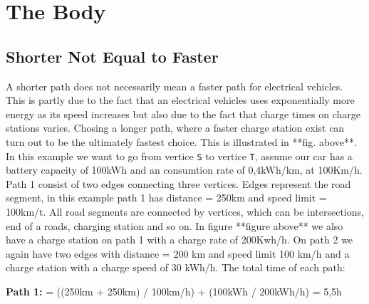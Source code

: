 \section{The Body}

\subsection{Shorter Not Equal to Faster}


A shorter path does not necessarily mean a faster path for electrical vehicles. 
This is partly due to the fact that an electrical vehicles uses exponentially more energy 
as its speed increases but also due to the fact that charge times on charge stations
varies. Chosing a longer path, where a faster charge station exist can turn out to
be the ultimately fastest choice. This is illustrated in **fig. above**. In this example we want to go from vertice \texttt{S} to vertice \texttt{T}, assume our car has a battery capacity of 100kWh and an consumtion rate of 0,4kWh/km, at 100Km/h. Path 1 consist of two edges connecting three vertices. Edges represent the road segment, in this example path 1 has distance = 250km and speed limit = 100km/t. All road segments are connected by vertices, which can be intersections, end of a roads, charging station and so on. In figure **figure above** we also have a charge station on path 1 with a charge rate of 200Kwh/h. On path 2 we again have two edges with distance = 200 km and speed limit 100 km/h and a charge station with a charge speed of 30 kWh/h.
The total time of each path:

\textbf{Path 1:}  = ((250km + 250km) / 100km/h) + (100kWh / 200kWh/h) = 5,5h

